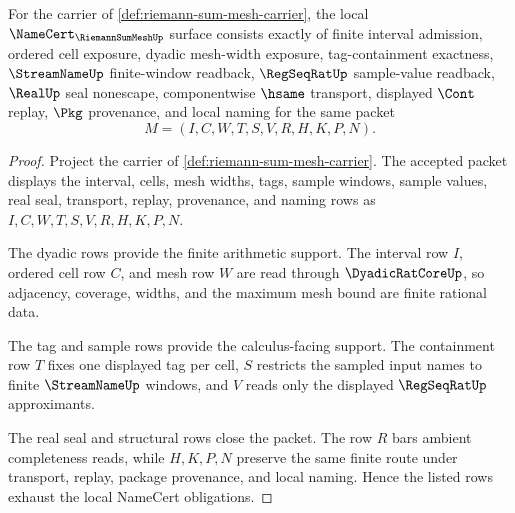 \begin{theorem}
\label{thm:riemann-sum-mesh-namecert-obligations}
For the carrier of \autoref{def:riemann-sum-mesh-carrier}, the local $\NameCert_{\RiemannSumMeshUp}$ surface consists exactly of finite interval admission, ordered cell exposure, dyadic mesh-width exposure, tag-containment exactness, $\StreamNameUp$ finite-window readback, $\RegSeqRatUp$ sample-value readback, $\RealUp$ seal nonescape, componentwise $\hsame$ transport, displayed $\Cont$ replay, $\Pkg$ provenance, and local naming for the same packet
$$
M=(I,C,W,T,S,V,R,H,K,P,N).
$$
\end{theorem}
\begin{proof}
Project the carrier of \autoref{def:riemann-sum-mesh-carrier}. The accepted packet displays the interval, cells, mesh widths, tags, sample windows, sample values, real seal, transport, replay, provenance, and naming rows as $I,C,W,T,S,V,R,H,K,P,N$.

The dyadic rows provide the finite arithmetic support. The interval row $I$, ordered cell row $C$, and mesh row $W$ are read through $\DyadicRatCoreUp$, so adjacency, coverage, widths, and the maximum mesh bound are finite rational data.

The tag and sample rows provide the calculus-facing support. The containment row $T$ fixes one displayed tag per cell, $S$ restricts the sampled input names to finite $\StreamNameUp$ windows, and $V$ reads only the displayed $\RegSeqRatUp$ approximants.

The real seal and structural rows close the packet. The row $R$ bars ambient completeness reads, while $H,K,P,N$ preserve the same finite route under transport, replay, package provenance, and local naming. Hence the listed rows exhaust the local NameCert obligations.
\end{proof}

